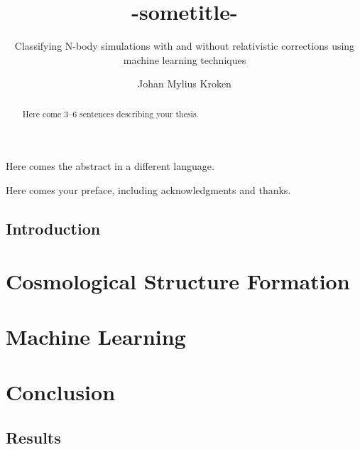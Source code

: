 \documentclass[UKenglish]{old_el_paso/uiomasterthesis}
\title{-sometitle-}        %
\subtitle{Classifying N-body simulations with and without
relativistic corrections using machine learning
techniques}         %
\author{Johan Mylius Kroken}                  %
\begin{document}
\uiomasterfp[dept={Institute of Theoretical Astrophysics},  %
  program={Computational Science: Astrophysics},                        %
  supervisors={A David Fonseca Mota\and B Julian Adamek\and C Francisco Antonio Villaescusa Navarro},
  color=green,     %
  long]                                     %
\frontmatter{}
\begin{abstract}
  Here come 3--6 sentences describing your thesis.
\end{abstract}

\begin{xabstract}[Sammendrag]               %
  Here comes the abstract in a different language.
\end{xabstract}

\tableofcontents{}                          %
\listoffigures{}                            %
\listoftables{}                             %

\begin{preface}
  Here comes your preface, including acknowledgments and thanks.
\end{preface}


\mainmatter{}
\chapter{Introduction}                  %



\part{Cosmological Structure Formation}                   %


\part{Machine Learning}                


\part{Conclusion}                     %
\chapter{Results}                     %

\backmatter{}
\printbibliography{}
\end{document}
